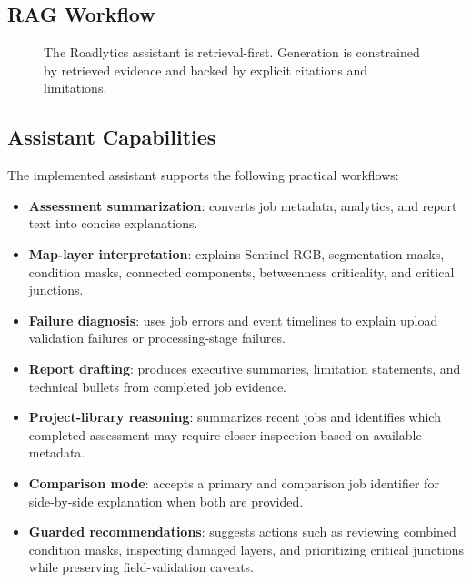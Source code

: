 ﻿\documentclass[conference]{IEEEtran}
\begin{document}
\subsection{RAG Workflow}
\begin{figure}[!t]
\centering
{}
\caption{The Roadlytics assistant is retrieval-first. Generation is constrained by retrieved evidence and backed by explicit citations and limitations.}
\label{fig:ragflow}
\end{figure}

\subsection{Assistant Capabilities}
The implemented assistant supports the following practical workflows:
\begin{itemize}
\item \textbf{Assessment summarization}: converts job metadata, analytics, and report text into concise explanations.
\item \textbf{Map-layer interpretation}: explains Sentinel RGB, segmentation masks, condition masks, connected components, betweenness criticality, and critical junctions.
\item \textbf{Failure diagnosis}: uses job errors and event timelines to explain upload validation failures or processing-stage failures.
\item \textbf{Report drafting}: produces executive summaries, limitation statements, and technical bullets from completed job evidence.
\item \textbf{Project-library reasoning}: summarizes recent jobs and identifies which completed assessment may require closer inspection based on available metadata.
\item \textbf{Comparison mode}: accepts a primary and comparison job identifier for side-by-side explanation when both are provided.
\item \textbf{Guarded recommendations}: suggests actions such as reviewing combined condition masks, inspecting damaged layers, and prioritizing critical junctions while preserving field-validation caveats.
\end{itemize}
\end{document}
